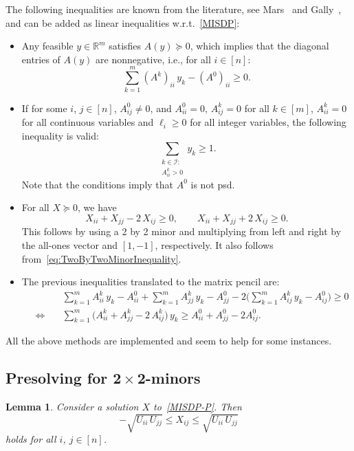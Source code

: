 \documentclass[10pt, a4paper]{article}
\newcommand{\R}{\mathds{R}}
\newtheorem{lemma}[theorem]{Lemma}
\begin{document}
The following inequalities are known from the literature, see
Mars~\cite{Mar13} and  Gally~\cite{Gal19}, and can be added as linear inequalities w.r.t.\
\eqref{MISDP}:
\begin{itemize}
\item Any feasible $y \in \R^m$ satisfies $A(y) \succeq 0$, which implies
  that the diagonal entries of $A(y)$ are nonnegative, i.e., for all
  $i \in [n]$:
  \[
    \sum_{k = 1}^m (A^k)_{ii}\, y_k - (A^0)_{ii} \geq 0.
  \]
\item If for some $i$, $j \in [n]$, $A^0_{ij} \neq 0$, and $A^0_{ii} = 0$,
  $A^k_{ij} = 0$ for all $k \in [m]$, $A^k_{ii} = 0$ for all continuous
  variables and $\ell_i \geq 0$ for all integer variables,
  the following inequality is valid:
  \[
    \sum_{\substack{k \in \mathcal{I}:\\ A^k_{ii} > 0}} y_k \geq 1.
  \]
  Note that the conditions imply that $A^0$ is not psd.
\item For all $X \succeq 0$, we have
  \[
    X_{ii} + X_{jj} - 2\, X_{ij} \geq 0,\qquad
    X_{ii} + X_{jj} + 2\, X_{ij} \geq 0.
  \]
  This follows by using a 2 by 2 minor and multiplying from left
  and right by the all-ones vector and $[1,-1]$, respectively. It also
  follows from~\eqref{eq:TwoByTwoMinorInequality}.
\item The previous inequalities translated to the matrix pencil are:
  \begin{align*}
    & \sum_{k=1}^m A^k_{ii}\, y_k - A^0_{ii} + \sum_{k=1}^m A^k_{jj}\, y_k - A^0_{jj} - 2 \Big(\sum_{k=1}^m A^k_{ij}\, y_k - A^0_{ij}\Big) \geq 0\\
    \quad\Leftrightarrow\quad&
    \sum_{k=1}^m \Big(A ^k_{ii} + A^k_{jj} - 2\, A^k_{ij}\Big)\, y_k \geq A^0_{ii} + A^0_{jj} - 2 A^0_{ij}.
  \end{align*}
\end{itemize}

All the above methods are implemented and seem to help for some instances.


\subsection{Presolving for $\boldsymbol{2 \times 2}$-minors}
\label{sec:2by2Minors}

\begin{lemma}
  Consider a solution $X$ to~\eqref{MISDP-P}. Then
  \[
    -\sqrt{U_{ii}\, U_{jj}} \leq X_{ij} \leq \sqrt{U_{ii}\, U_{jj}}
  \]
  holds for all $i$, $j \in [n]$.
\end{lemma}
\end{document}
